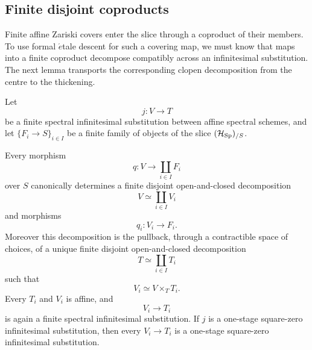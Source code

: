 \subsection{Finite disjoint coproducts}

Finite affine Zariski covers enter the slice through a coproduct of their
members. To use formal \(\acute{e}\)tale descent for such a covering map, we
must know that maps into a finite coproduct decompose compatibly across an
infinitesimal substitution. The next lemma transports the corresponding
clopen decomposition from the centre to the thickening.

\begin{lemma}
\label{lem:finite-clopen-decomposition-infinitesimal}
Let
\[
  j:V\longrightarrow T
\]
be a finite spectral infinitesimal substitution between affine spectral schemes, and
let \(\{F_i\to S\}_{i\in I}\) be a finite family of objects of the slice
\((\mathcal H_{\operatorname{Sp}})_{/S}\).

Every morphism
\[
  q:V\longrightarrow\coprod_{i\in I}F_i
\]
over \(S\) canonically determines a finite disjoint open-and-closed decomposition
\[
  V\simeq\coprod_{i\in I}V_i
\]
and morphisms
\[
  q_i:V_i\longrightarrow F_i.
\]
Moreover this decomposition is the pullback, through a contractible space of
choices, of a unique finite disjoint open-and-closed decomposition
\[
  T\simeq\coprod_{i\in I}T_i
\]
such that
\[
  V_i\simeq V\times_TT_i.
\]
Every \(T_i\) and \(V_i\) is affine, and
\[
  V_i\longrightarrow T_i
\]
is again a finite spectral infinitesimal substitution. If \(j\) is a one-stage
square-zero infinitesimal substitution, then every \(V_i\to T_i\) is a one-stage
square-zero infinitesimal substitution.
\end{lemma}

